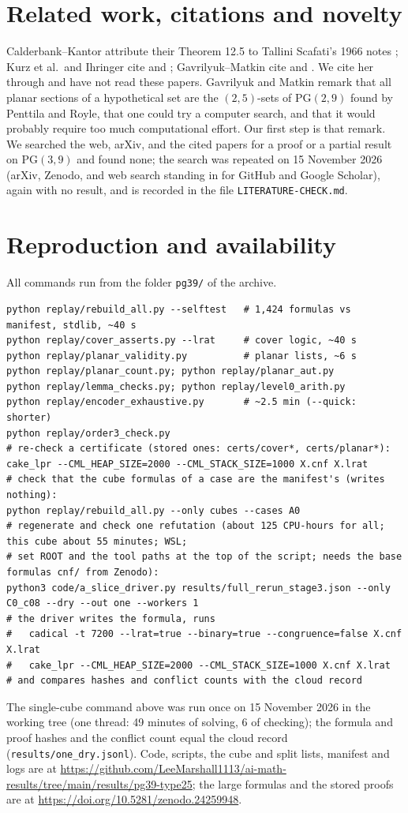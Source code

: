 \documentclass[11pt]{article}
\theoremstyle{plain}
\theoremstyle{remark}
\newcommand{\PG}{\mathrm{PG}}
\newcommand{\file}[1]{\texttt{#1}}
\begin{document}
\section{Related work, citations and novelty}\label{sec:lit}
Calderbank--Kantor \cite{CK} attribute their Theorem 12.5 to Tallini Scafati's 1966 notes \cite{TS66}; Kurz et al.\ and Ihringer cite \cite{TS72} and \cite{TS76}; Gavrilyuk--Matkin cite \cite{TS66} and \cite{CK}.
We cite her through \cite{CK} and have not read these papers.
Gavrilyuk and Matkin \cite{GM} remark that all planar sections of a hypothetical set are the $(2,5)$-sets of $\PG(2,9)$ found by Penttila and Royle, that one could try a computer search, and that it would probably require too much computational effort.
Our first step is that remark.
We searched the web, arXiv, and the cited papers for a proof or a partial result on $\PG(3,9)$ and found none; the search was repeated on 15 November 2026 (arXiv, Zenodo, and web search standing in for GitHub and Google Scholar), again with no result, and is recorded in the file \texttt{LITERATURE-CHECK.md}.

\section{Reproduction and availability}
All commands run from the folder \file{pg39/} of the archive.
\begin{verbatim}
python replay/rebuild_all.py --selftest   # 1,424 formulas vs manifest, stdlib, ~40 s
python replay/cover_asserts.py --lrat     # cover logic, ~40 s
python replay/planar_validity.py          # planar lists, ~6 s
python replay/planar_count.py; python replay/planar_aut.py
python replay/lemma_checks.py; python replay/level0_arith.py
python replay/encoder_exhaustive.py       # ~2.5 min (--quick: shorter)
python replay/order3_check.py
# re-check a certificate (stored ones: certs/cover*, certs/planar*):
cake_lpr --CML_HEAP_SIZE=2000 --CML_STACK_SIZE=1000 X.cnf X.lrat
# check that the cube formulas of a case are the manifest's (writes nothing):
python replay/rebuild_all.py --only cubes --cases A0
# regenerate and check one refutation (about 125 CPU-hours for all; this cube about 55 minutes; WSL;
# set ROOT and the tool paths at the top of the script; needs the base formulas cnf/ from Zenodo):
python3 code/a_slice_driver.py results/full_rerun_stage3.json --only C0_c08 --dry --out one --workers 1
# the driver writes the formula, runs
#   cadical -t 7200 --lrat=true --binary=true --congruence=false X.cnf X.lrat
#   cake_lpr --CML_HEAP_SIZE=2000 --CML_STACK_SIZE=1000 X.cnf X.lrat
# and compares hashes and conflict counts with the cloud record
\end{verbatim}
The single-cube command above was run once on 15 November 2026 in the working tree (one thread: 49 minutes of solving, 6 of checking); the formula and proof hashes and the conflict count equal the cloud record (\texttt{results/one\_dry.jsonl}).
Code, scripts, the cube and split lists, manifest and logs are at \url{https://github.com/LeeMarshall1113/ai-math-results/tree/main/results/pg39-type25}; the large formulas and the stored proofs are at \url{https://doi.org/10.5281/zenodo.24259948}.
\end{document}
